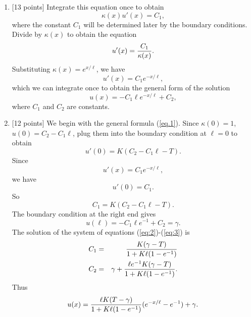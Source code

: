 \begin{solution}
\begin{enumerate}
\item {[13 points]} Integrate this equation once to obtain
\[
\kappa(x)u'(x) = C_1,
\]
where the constant $C_1$ will be determined later by the boundary conditions.  Divide by $\kappa(x)$ to obtain the equation
\[
u'(x) = {C_1\over \kappa(x)}.
\]
Substituting $\kappa(x) =  e^{x/\ell}$, we have
\[
u'(x) = {C_1 e^{-x/\ell}},
\]
which we can integrate once to obtain the general form of the solution
\begin{equation}\label{eq.1}
u(x) = {-C_1\ell }  e^{-x/\ell}+ C_2,
\end{equation}
where $C_1$ and $C_2$ are constants.
\\
\item {[12 points]} We begin with the general formula (\ref{eq.1}). Since $\kappa(0)=1$, $u(0)=C_2-C_1\ell$, plug them into the boundary condition at $\ell = 0$ to obtain
\[
u'(0)=K(C_2-C_1\ell-T).
\]
Since
\[
u'(x) = C_1 e^{-x/\ell},
\]
we have
\[
u'(0) = C_1.
\]
So 
\begin{equation} \label{eq:2} 
C_1=K(C_2-C_1\ell-T). 
\end{equation} 
The boundary condition at the right end gives 
\begin{equation} \label{eq:3} 
u(\ell) = -C_1\ell e^{-1} + C_2=\gamma.
\end{equation}
The solution of the system of equations (\ref{eq:2})-(\ref{eq:3}) is 
\begin{eqnarray*}
C_1 &=& {K(\gamma-T)}\over{1+K\ell(1-e^{-1})}
\\
C_2 &=& \gamma + \frac{\ell e^{-1}K(\gamma-T)}{1+K\ell(1-e^{-1})}.
\end{eqnarray*}
Thus
\[
u(x)={{\ell K(T-\gamma)}\over{1+K\ell(1-e^{-1})}}( e^{-x/\ell}-e^{-1})+\gamma.
\]
\end{enumerate}
\end{solution}
